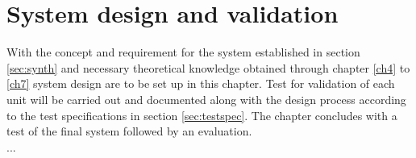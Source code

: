 \chapter{System design and validation} \label{ch8}
With the concept and requirement for the system established in section \ref{sec:synth} and necessary theoretical knowledge obtained through chapter \ref{ch4} to \ref{ch7} system design are to be set up in this chapter. Test for validation of each unit will be carried out and documented along with the design process according to the test specifications in section \ref{sec:testspec}. The chapter concludes with a test of the final system followed by an evaluation.  \\
... 


